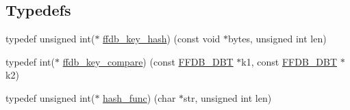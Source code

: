 \subsection*{Typedefs}
\begin{DoxyCompactItemize}
\item 
typedef unsigned int($\ast$ \mbox{\hyperlink{namespaceFILEDB_a62446cf48b614494d5708110ddc414bf}{ffdb\+\_\+key\+\_\+hash}}) (const void $\ast$bytes, unsigned int len)
\item 
typedef int($\ast$ \mbox{\hyperlink{namespaceFILEDB_a1d3bd589ccfab62ecdd78b46aba576e2}{ffdb\+\_\+key\+\_\+compare}}) (const \mbox{\hyperlink{other__libs_2filedb_2filehash_2ffdb__db_8h_aa2e0984399491df0fdd20898ca8758f9}{F\+F\+D\+B\+\_\+\+D\+BT}} $\ast$k1, const \mbox{\hyperlink{other__libs_2filedb_2filehash_2ffdb__db_8h_aa2e0984399491df0fdd20898ca8758f9}{F\+F\+D\+B\+\_\+\+D\+BT}} $\ast$k2)
\item 
typedef unsigned int($\ast$ \mbox{\hyperlink{namespaceFILEDB_a9e945e165dd500023ad29b4fcb2332b8}{hash\+\_\+func}}) (char $\ast$str, unsigned int len)
\end{DoxyCompactItemize}
